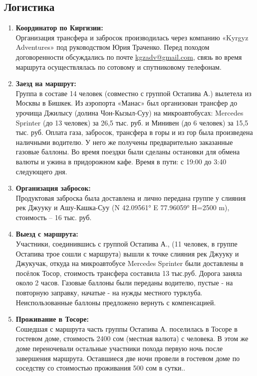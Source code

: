 \subsection{Логистика}
\begin{enumerate}[]

\item \textbf{Координатор по Киргизии:}\\
Организация трансфера и забросок производилась через компанию «Kyrgyz Adventures» под руководством Юрия Траченко. Перед походом договоренности обсуждались по почте \href{mailto: kgzadv@gmail.com}{kgzadv@gmail.com}, связь во время маршрута осуществлялась по сотовому и спутниковому телефонам.
\item \textbf{Заезд на маршрут:}\\
Группа в составе 14 человек (совместно с группой Остапива А.) вылетела из Москвы в Бишкек. Из аэропорта «Манас» был организован трансфер до урочища Джилысу (долина Чон-Кызыл-Суу) на микроавтобусах: Mercedes Sprinter (до 13 человек) за 26,5 тыс. руб. и Минивен (до 6 человек) за 15,5 тыс. руб. Оплата газа, забросок, трансфера в горы и из гор была произведена наличными водителю. У него же получены предварительно заказанные газовые баллоны.
Во время поездки были сделаны остановки для обмена валюты и ужина в придорожном кафе.
Время в пути: с 19:00 до 3:40 следующего дня.
\item \textbf{Организация забросок:}\\
Продуктовая заброска была доставлена и лично передана группе у слияния рек Джууку и Ашу-Кашка-Суу (N 42.09561° E 77.96059° H=2500 m), стоимость – 16 тыс. руб.
\item \textbf{Выезд с маршрута:} \\
Участники, соединившись с группой Остапива А., (11 человек, в группе Остапива трое сошли с маршрута) вышли к точке слияния рек Джууку и Джукучак, откуда на микроавтобусе Mercedes Sprinter были доставлены в посёлок Тосор, стоимость трансфера составила 13 тыс.руб. Дорога заняла около 2 часов. 
Газовые баллоны были переданы водителю, пустые -  на повторную заправку, начатые -  на нужды местного турклуба. Неиспользованные баллоны предложено вернуть с компенсацией.
\item \textbf{Проживание в Тосоре:}\\
Сошедшая с маршрута часть группы Остапива А. поселилась в Тосоре в гостевом доме, стоимость 2400 сом (местная валюта) с человека. В этом же доме переночевали остальные участники похода первую ночь после завершения маршрута. Оставшиеся две ночи провели в гостевом доме по соседству со стоимостью проживания 500 сом в сутки..

\end{enumerate}
